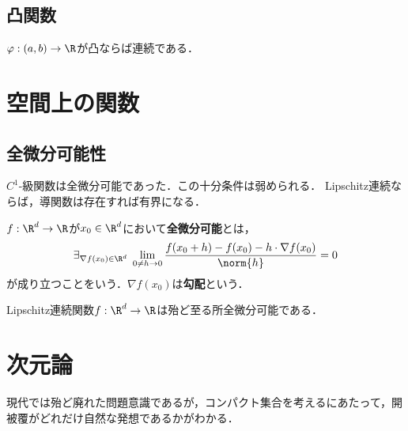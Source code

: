 \documentclass[uplatex,dvipdfmx]{jsreport}
\begin{document}
\subsection{凸関数}


\begin{theorem}[凸関数は開区間上で連続]
    $\varphi:(a,b)\to\R$が凸ならば連続である．
\end{theorem}
\begin{Proof}
    
\end{Proof}

\section{空間上の関数}


\subsection{全微分可能性}

\begin{tcolorbox}[colframe=ForestGreen, colback=ForestGreen!10!white,breakable,colbacktitle=ForestGreen!40!white,coltitle=black,fonttitle=\bfseries\sffamily,
title=]
    $C^1$-級関数は全微分可能であった．この十分条件は弱められる．
    Lipschitz連続ならば，導関数は存在すれば有界になる．
\end{tcolorbox}

\begin{definition}
    $f:\R^d\to\R$が$x_0\in\R^d$において\textbf{全微分可能}とは，
    \[\exists_{\nabla f(x_0)\in\R^d}\;\lim_{0\ne h\to 0}\frac{f(x_0+h)-f(x_0)-h\cdot\nabla f(x_0)}{\norm{h}}=0\]
    が成り立つことをいう．$\nabla f(x_0)$は\textbf{勾配}という．
\end{definition}

\begin{theorem}
    Lipschitz連続関数$f:\R^d\to\R$は殆ど至る所全微分可能である．
\end{theorem}


\section{次元論}

\begin{tcolorbox}[colframe=ForestGreen, colback=ForestGreen!10!white,breakable,colbacktitle=ForestGreen!40!white,coltitle=black,fonttitle=\bfseries\sffamily,
title=]
    現代では殆ど廃れた問題意識であるが，コンパクト集合を考えるにあたって，開被覆がどれだけ自然な発想であるかがわかる．
\end{tcolorbox}
\end{document}
